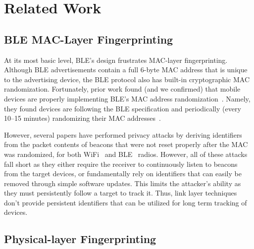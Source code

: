 \section{Related Work}
\label{sec:relatedwork}
\subsection*{BLE MAC-Layer Fingerprinting}
%
At its most basic level, BLE's design frustrates MAC-layer fingerprinting.
%
Although BLE advertisements contain a full 6-byte MAC address that is unique to the
advertising device, the BLE protocol also has built-in cryptographic MAC randomization.
%
Fortunately, prior work found (and we confirmed) that mobile devices are
properly implementing BLE's MAC address randomization~\cite{Iphonetracking_becker,MACRandomizationfail_Martin}.
%
Namely, they found devices are following the BLE specification and periodically
(every 10--15 minutes) randomizing their MAC addresses~\cite{bluetoothprivacy}.
%

However, several papers have performed privacy attacks by deriving identifiers from the packet contents of beacons that were not reset properly after the MAC was
randomized, for both WiFi~\cite{sn1,MACRandomizationfail_Martin} and BLE~\cite{ryanble,spill2007bluesniff,Iphonetracking_becker,HandoffMartin,celosia2020close} radios.
%
However, all of these attacks fall short as they either require the receiver to continuously listen to beacons from the target devices, or fundamentally rely on identifiers that can easily be removed through simple software updates.
%
This limits the attacker's ability as they must persistently follow a target to track it.
%
Thus, link layer techniques don't provide persistent identifiers that can be utilized for long term tracking of devices.

\vspace{0.5em}

\subsection*{Physical-layer Fingerprinting}


